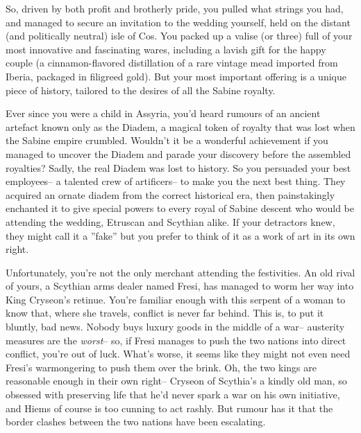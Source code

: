 \documentclass[char]{Kos}
\begin{document}
So, driven by both profit and brotherly pride, you pulled what strings you had, and managed to secure an invitation to the wedding yourself, held on the distant (and politically neutral) isle of Cos. You packed up a valise (or three) full of your most innovative and fascinating wares, including a lavish gift for the happy couple (a cinnamon-flavored distillation of a rare vintage mead imported from Iberia, packaged in filigreed gold). But your most important offering is a unique piece of history, tailored to the desires of all the Sabine royalty. 

Ever since you were a child in Assyria, you'd heard rumours of an ancient artefact known only as the Diadem, a magical token of royalty that was lost when the Sabine empire crumbled. Wouldn't it be a wonderful achievement if you managed to uncover the Diadem and parade your discovery before the assembled royalties? Sadly, the real Diadem was lost to history. So you persuaded your best employees-- a talented crew of artificers-- to make you the next best thing. They acquired an ornate diadem from the correct historical era, then painstakingly enchanted it to give special powers to every royal of Sabine descent who would be attending the wedding, Etruscan and Scythian alike. If your detractors knew, they might call it a ''fake'' but you prefer to think of it as a work of art in its own right.

Unfortunately, you're not the only merchant attending the festivities. An old rival of yours, a Scythian arms dealer named Fresi, has managed to worm her way into King Cryseon's retinue. You're familiar enough with this serpent of a woman to know that, where she travels, conflict is never far behind. This is, to put it bluntly, bad news. Nobody buys luxury goods in the middle of a war-- austerity measures are the \textit{worst}-- so, if Fresi manages to push the two nations into direct conflict, you're out of luck. What's worse, it seems like they might not even need Fresi's warmongering to push them over the brink. Oh, the two kings are reasonable enough in their own right-- Cryseon of Scythia's a kindly old man, so obsessed with preserving life that he'd never spark a war on his own initiative, and Hiems of course is too cunning to act rashly. But rumour has it that the border clashes between the two nations have been escalating. 
\end{document}
